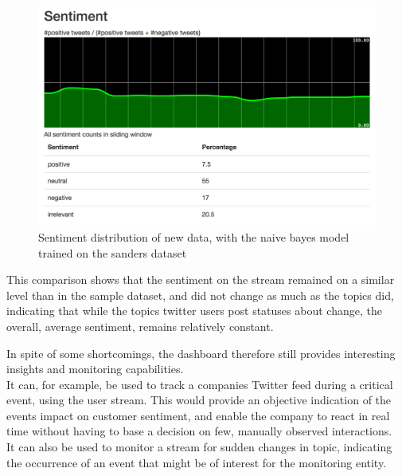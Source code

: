 \begin{figure}
    \centering
    \caption{Sentiment distribution of new data, with the naive bayes model trained on the sanders dataset}
    \label{fig:sample_sentiment_distribtion_new}
    \includegraphics[width=\textwidth]{../images/dashboard_sentiment_sample.png}
\end{figure}

This comparison shows that the sentiment on the stream remained on a similar level than in the sample dataset,
and did not change as much as the topics did, indicating that while the topics twitter users post statuses about change,
the overall, average sentiment, remains relatively constant.

\par
In spite of some shortcomings, the dashboard therefore still provides interesting insights and monitoring capabilities.
\\
It can, for example, be used to track a companies Twitter feed during a critical event, using the user stream.
This would provide an objective indication of the events impact on customer sentiment,
and enable the company to react in real time without having to base a decision on few, manually observed interactions.
\\
It can also be used to monitor a stream for sudden changes in topic,
indicating the occurrence of an event that might be of interest for the monitoring entity.